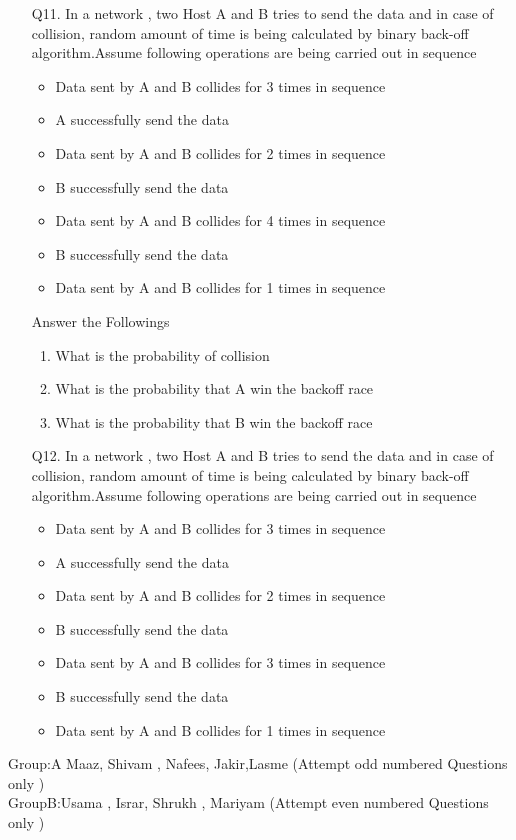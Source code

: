 \documentclass[a4paper,11pt]{article}
\begin{document}
\begin{enumerate}
\item[Q11.]
In a network , two Host A and B tries to send the data and in case of collision, random amount of time is being calculated by binary back-off algorithm.Assume following operations are being carried out in sequence
\begin{itemize}
  \item  Data sent by A and B collides for 3 times in sequence
  \item A successfully send the data
  \item  Data sent by A and B collides for 2 times in sequence
  \item B successfully send the data
  \item Data sent by A and B collides for 4 times in sequence
  \item B successfully send the data
  \item Data sent by A and B collides for 1 times in sequence
\end{itemize}
Answer the Followings
\begin{enumerate}
  \item What is the probability of collision
  \item What is the probability that A win the backoff race
  \item What is the probability that B win the backoff race
\end{enumerate}


\item[Q12.]
In a network , two Host A and B tries to send the data and in case of collision, random amount of time is being calculated by binary back-off algorithm.Assume following operations are being carried out in sequence
\begin{itemize}
  \item  Data sent by A and B collides for 3 times in sequence
  \item A successfully send the data
  \item  Data sent by A and B collides for 2 times in sequence
  \item B successfully send the data
  \item Data sent by A and B collides for 3 times in sequence
  \item B successfully send the data
  \item Data sent by A and B collides for 1 times in sequence
\end{itemize}















\end{enumerate}
Group:A Maaz, Shivam , Nafees, Jakir,Lasme (Attempt odd numbered Questions only ) \\
GroupB:Usama , Israr, Shrukh , Mariyam (Attempt even numbered Questions only )\\
\end{document}
